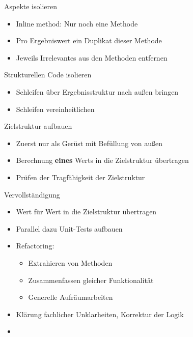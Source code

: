 \begin{frame}[t,fragile]{Aspekte isolieren}
\begin{itemize}
\item Inline method: Nur noch eine Methode
\item Pro Ergebniswert ein Duplikat dieser Methode
\item Jeweils Irrelevantes aus den Methoden entfernen
\end{itemize}
\end{frame}

\begin{frame}[t,fragile]{Strukturellen Code isolieren}
\begin{itemize}
\item Schleifen über Ergebnisstruktur nach außen bringen
\item Schleifen vereinheitlichen
\end{itemize}
\end{frame}

\begin{frame}[t,fragile]{Zielstruktur aufbauen}
\begin{itemize}
\item Zuerst nur als Gerüst mit Befüllung von außen
\item Berechnung \textbf{eines} Werts in die Zielstruktur übertragen
\item Prüfen der Tragfähigkeit der Zielstruktur
\end{itemize}
\end{frame}

\begin{frame}[t,fragile]{Vervollständigung}
\begin{itemize}
\item Wert für Wert in die Zielstruktur übertragen
\item Parallel dazu Unit-Tests aufbauen
\item Refactoring: 
\begin{itemize}
\item Extrahieren von Methoden
\item Zusammenfassen gleicher Funktionalität
\item Generelle Aufräumarbeiten
\end{itemize}
\item Klärung fachlicher Unklarheiten, Korrektur der Logik
\end{itemize}
\end{frame}

\begin{frame}[t,fragile]{}
\begin{itemize}
\item
\end{itemize}
\end{frame}

